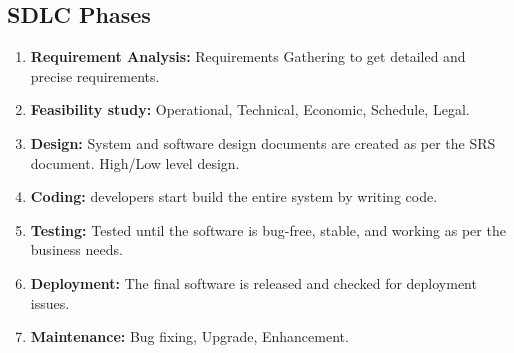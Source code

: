 \subsection*{SDLC Phases}

\begin{enumerate}[label=Phase \arabic*:,left=0pt,itemsep=0.5ex]
   \item \textbf{Requirement Analysis:} Requirements Gathering to get detailed and precise requirements.
   
   \item \textbf{Feasibility study:}
   Operational, Technical, Economic, Schedule, Legal.
   \item \textbf{Design:}
   System and software design documents are created as
   per the SRS document. High/Low level design.
   \item \textbf{Coding:} developers start build the entire system by writing code.
   
   \item \textbf{Testing:} Tested until the software is bug-free, stable, and working as per the business needs.
   
   \item \textbf{Deployment:} The final software is released and checked for deployment issues.
   
   \item \textbf{Maintenance:} Bug fixing, Upgrade, Enhancement.
\end{enumerate}